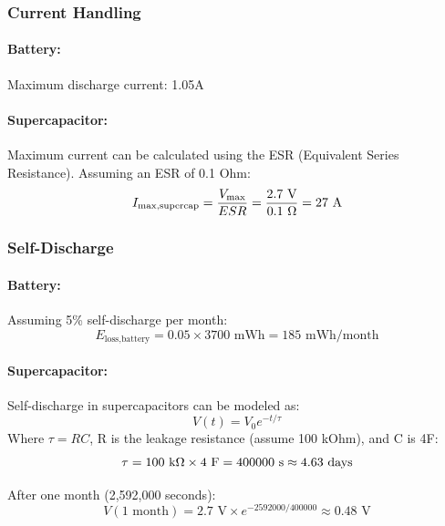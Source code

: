 \documentclass[a4paper,11pt]{article}%
\begin{document}
\subsubsection{Current Handling}

\paragraph{Battery:}
Maximum discharge current: 1.05A

\paragraph{Supercapacitor:}
Maximum current can be calculated using the ESR (Equivalent Series Resistance). Assuming an ESR of 0.1 Ohm:
\begin{equation}
    I_{\text{max,supercap}} = \frac{V_{\text{max}}}{ESR} = \frac{2.7 \text{ V}}{0.1 \text{ \ohm}} = 27 \text{ A}
\end{equation}

\subsubsection{Self-Discharge}

\paragraph{Battery:}
Assuming 5\% self-discharge per month:
\begin{equation}
    E_{\text{loss,battery}} = 0.05 \times 3700 \text{ mWh} = 185 \text{ mWh/month}
\end{equation}

\paragraph{Supercapacitor:}
Self-discharge in supercapacitors can be modeled as:
\begin{equation}
    V(t) = V_0 e^{-t/\tau}
\end{equation}
Where $\tau = RC$, R is the leakage resistance (assume 100 kOhm), and C is 4F:
\begin{equation}
    \tau = 100 \text{ k\ohm} \times 4 \text{ F} = 400000 \text{ s} \approx 4.63 \text{ days}
\end{equation}

After one month (2,592,000 seconds):
\begin{equation}
    V(1 \text{ month}) = 2.7 \text{ V} \times e^{-2592000/400000} \approx 0.48 \text{ V}
\end{equation}
\end{document}
